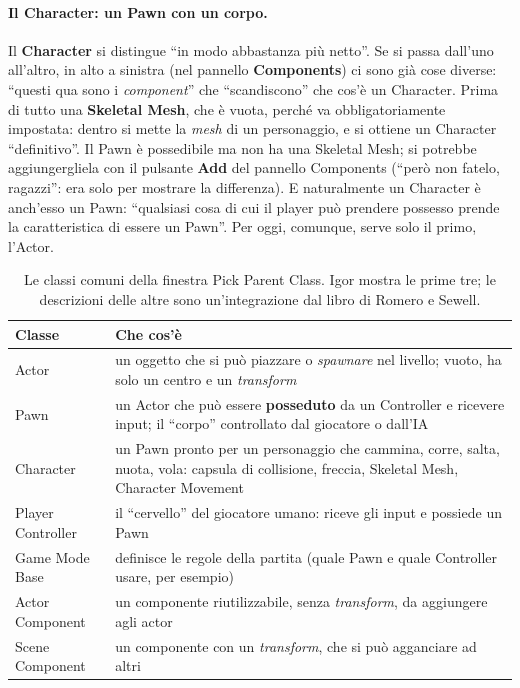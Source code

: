 \paragraph{Il Character: un Pawn con un corpo.} Il \textbf{Character} si distingue ``in
modo abbastanza più netto''. Se si passa dall'uno all'altro, in alto a sinistra (nel
pannello \textbf{Components}) ci sono già cose diverse: ``questi qua sono i
\emph{component}'' che ``scandiscono'' che cos'è un Character. Prima di tutto una
\textbf{Skeletal Mesh}, che è vuota, perché va obbligatoriamente impostata: dentro si
mette la \emph{mesh} di un personaggio, e si ottiene un Character ``definitivo''. Il
Pawn è possedibile ma non ha una Skeletal Mesh; si potrebbe aggiungergliela con il
pulsante \textbf{Add} del pannello Components (``però non fatelo, ragazzi'': era solo per
mostrare la differenza). E naturalmente un Character è anch'esso un Pawn: ``qualsiasi
cosa di cui il player può prendere possesso prende la caratteristica di essere un
Pawn''. Per oggi, comunque, serve solo il primo, l'Actor.

\begin{table}[htbp]
\centering
\small
\begin{tabular}{@{}p{3.0cm}p{10.0cm}@{}}
\toprule
\textbf{Classe} & \textbf{Che cos'è} \\
\midrule
Actor & un oggetto che si può piazzare o \emph{spawnare} nel livello; vuoto, ha solo un
  centro e un \emph{transform} \\
Pawn & un Actor che può essere \textbf{posseduto} da un Controller e ricevere input; il
  ``corpo'' controllato dal giocatore o dall'IA \\
Character & un Pawn pronto per un personaggio che cammina, corre, salta, nuota, vola:
  capsula di collisione, freccia, Skeletal Mesh, Character Movement \\
Player Controller & il ``cervello'' del giocatore umano: riceve gli input e possiede un
  Pawn \\
Game Mode Base & definisce le regole della partita (quale Pawn e quale Controller usare,
  per esempio) \\
Actor Component & un componente riutilizzabile, senza \emph{transform}, da aggiungere
  agli actor \\
Scene Component & un componente con un \emph{transform}, che si può agganciare ad altri
  \\
\bottomrule
\end{tabular}
\caption{Le classi comuni della finestra Pick Parent Class. Igor mostra le prime tre; le
descrizioni delle altre sono un'integrazione dal libro di Romero e Sewell.}
\label{ue2:tab:classi}
\end{table}

